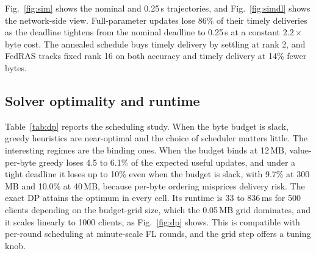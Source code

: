 \documentclass[preprint,12pt]{elsarticle}
\begin{document}
Fig.~\ref{fig:sim} shows the nominal and 0.25\,s trajectories, and Fig.~\ref{fig:simdl} shows the network-side view. Full-parameter updates lose 86\% of their timely deliveries as the deadline tightens from the nominal deadline to 0.25\,s at a constant $2.2\times$ byte cost. The annealed schedule buys timely delivery by settling at rank 2, and FedRAS tracks fixed rank 16 on both accuracy and timely delivery at 14\% fewer bytes.

\begin{table}[H]
\centering
\caption{Solver study (500 clients, $K{=}25$, 30 instances per cell): optimality gap of heuristics relative to the exact DP, and DP runtime.}
\label{tab:dp}
\end{table}

\subsection{Solver optimality and runtime}
\label{sec:dp_study}
Table~\ref{tab:dp} reports the scheduling study. When the byte budget is slack, greedy heuristics are near-optimal and the choice of scheduler matters little. The interesting regimes are the binding ones. When the budget binds at 12\,MB, value-per-byte greedy loses 4.5 to 6.1\% of the expected useful updates, and under a tight deadline it loses up to 10\% even when the budget is slack, with 9.7\% at 300\,MB and 10.0\% at 40\,MB, because per-byte ordering misprices delivery risk. The exact DP attains the optimum in every cell. Its runtime is 33 to 836\,ms for 500 clients depending on the budget-grid size, which the 0.05\,MB grid dominates, and it scales linearly to 1000 clients, as Fig.~\ref{fig:dp} shows. This is compatible with per-round scheduling at minute-scale FL rounds, and the grid step offers a tuning knob.
\end{document}
